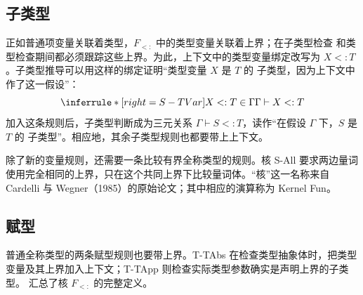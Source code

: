 \subsection*{子类型}

正如普通项变量关联着类型，\(F_{<:}\) 中的类型变量关联着上界；在子类型检查
和类型检查期间都必须跟踪这些上界。为此，上下文中的类型变量绑定改写为
\(X<:T\)。子类型推导可以用这样的绑定证明“类型变量 \(X\) 是 \(T\) 的
子类型，因为上下文中作了这一假设”：
\[
\inferrule*[right=S-TVar]
 {X<:T\in\Gamma}
 {\Gamma\vdash X<:T}
\]
加入这条规则后，子类型判断成为三元关系
\(\Gamma\vdash S<:T\)，读作“在假设 \(\Gamma\) 下，\(S\) 是 \(T\) 的
子类型”。相应地，其余子类型规则也都要带上上下文。

除了新的变量规则，还需要一条比较有界全称类型的规则。核 S-All 要求两边量词
使用完全相同的上界，只在这个共同上界下比较量词体。“核”这一名称来自
Cardelli 与 Wegner（1985）的原始论文；其中相应的演算称为 Kernel Fun。

\subsection*{赋型}

普通全称类型的两条赋型规则也要带上界。T-TAbs 在检查类型抽象体时，把类型
变量及其上界加入上下文；T-TApp 则检查实际类型参数确实是声明上界的子类型。
汇总了核 \(F_{<:}\) 的完整定义。

